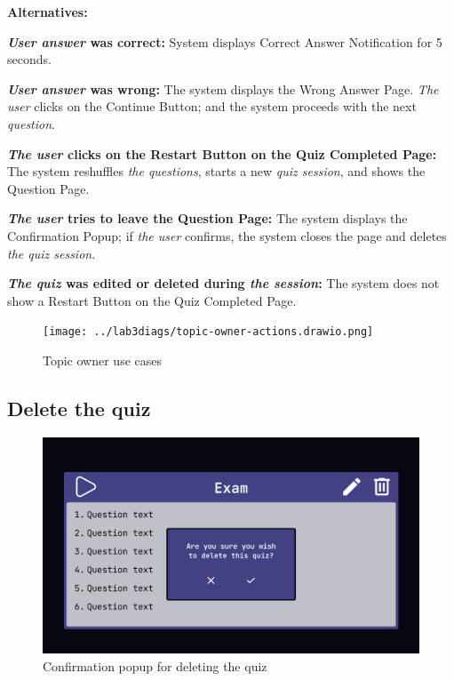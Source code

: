 \documentclass[
    english, %
]{VUMIFPSkursinis}
\begin{document}
\noindent\textbf{\fontsize{13}{15}\selectfont Alternatives:}

\textbf{\textit{User answer} was correct:} System displays Correct Answer Notification for 5 seconds.

\textbf{\textit{User answer} was wrong:} The system displays the Wrong Answer Page. \textit{The user} clicks on the Continue Button; and the system proceeds with the next \textit{question}.

\textbf{\textit{The user} clicks on the Restart Button on the Quiz Completed Page:} The system reshuffles \textit{the questions}, starts a new \textit{quiz session}, and shows the Question Page.

\textbf{\textit{The user} tries to leave the Question Page:} The system displays the Confirmation Popup; if \textit{the user} confirms, the system closes the page and deletes \textit{the quiz session}.

\textbf{\textit{The quiz} was edited or deleted during \textit{the session}:} The system does not show a Restart Button on the Quiz Completed Page.

\begin{figure}[ht]
    \centering
    \texttt{[image: ../lab3diags/topic-owner-actions.drawio.png]}
    \caption{Topic owner use cases}
    \label{topic-owner}
\end{figure}

\subsection{Delete the quiz}

\begin{figure}[ht]
    \centering
    \includegraphics[width=\textwidth]{../lab3diags/Quiz delete popup.png}
    \caption{Confirmation popup for deleting the quiz}
    \label{wireframe-quiz-delete-popup}
\end{figure}
\end{document}
